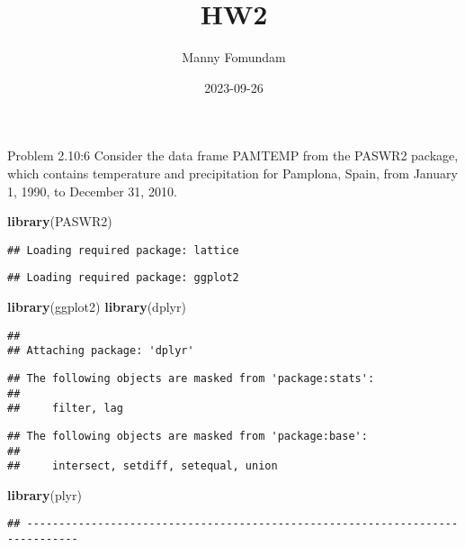 \documentclass[
]{article}
\title{HW2}
\author{Manny Fomundam}
\date{2023-09-26}
\newenvironment{Shaded}{\begin{snugshade}}{\end{snugshade}}
\newcommand{\FunctionTok}[1]{\textcolor[rgb]{0.13,0.29,0.53}{\textbf{#1}}}
\newcommand{\NormalTok}[1]{#1}
\begin{document}
\maketitle

Problem 2.10:6 Consider the data frame PAMTEMP from the PASWR2 package,
which contains temperature and precipitation for Pamplona, Spain, from
January 1, 1990, to December 31, 2010.

\begin{Shaded}
\begin{Highlighting}[]
\FunctionTok{library}\NormalTok{(PASWR2)}
\end{Highlighting}
\end{Shaded}

\begin{verbatim}
## Loading required package: lattice
\end{verbatim}

\begin{verbatim}
## Loading required package: ggplot2
\end{verbatim}

\begin{Shaded}
\begin{Highlighting}[]
\FunctionTok{library}\NormalTok{(ggplot2)}
\FunctionTok{library}\NormalTok{(dplyr)}
\end{Highlighting}
\end{Shaded}

\begin{verbatim}
## 
## Attaching package: 'dplyr'
\end{verbatim}

\begin{verbatim}
## The following objects are masked from 'package:stats':
## 
##     filter, lag
\end{verbatim}

\begin{verbatim}
## The following objects are masked from 'package:base':
## 
##     intersect, setdiff, setequal, union
\end{verbatim}

\begin{Shaded}
\begin{Highlighting}[]
\FunctionTok{library}\NormalTok{(plyr)}
\end{Highlighting}
\end{Shaded}

\begin{verbatim}
## ------------------------------------------------------------------------------
\end{verbatim}
\end{document}
